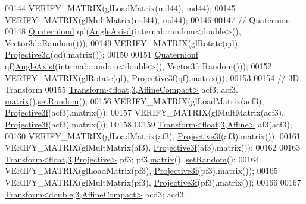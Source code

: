 \begin{DoxyCode}
00144   VERIFY\_MATRIX(glLoadMatrix(md44), md44);
00145   VERIFY\_MATRIX(glMultMatrix(md44), md44);
00146   
00147   \textcolor{comment}{// Quaternion}
00148   \hyperlink{group___geometry___module_class_eigen_1_1_quaternion}{Quaterniond} qd(\hyperlink{group___geometry___module_gac218cd8f23b49aa36401d0c843bb6835}{AngleAxisd}(internal::random<double>(), Vector3d::Random()));
00149   VERIFY\_MATRIX(glRotate(qd), \hyperlink{group___geometry___module_gab9cec8c457da930391eb73370e07aaae}{Projective3d}(qd).matrix());
00150   
00151   \hyperlink{group___geometry___module_class_eigen_1_1_quaternion}{Quaternionf} qf(\hyperlink{group___geometry___module_gadc7128416da41ca99bb8af814b78599e}{AngleAxisf}(internal::random<double>(), Vector3f::Random()));
00152   VERIFY\_MATRIX(glRotate(qf), \hyperlink{group___geometry___module_gab14804071b7486b6666f3d324475a478}{Projective3f}(qf).matrix());
00153   
00154   \textcolor{comment}{// 3D Transform}
00155   \hyperlink{group___geometry___module_class_eigen_1_1_transform}{Transform<float,3,AffineCompact>} acf3; acf3.
      \hyperlink{group___geometry___module_aec8168000a88a807130d41020af98d47}{matrix}().\hyperlink{class_eigen_1_1_plain_object_base_af0e576a0e1aefc9ee346de44cc352ba3}{setRandom}();
00156   VERIFY\_MATRIX(glLoadMatrix(acf3), \hyperlink{group___geometry___module_gab14804071b7486b6666f3d324475a478}{Projective3f}(acf3).matrix());
00157   VERIFY\_MATRIX(glMultMatrix(acf3), \hyperlink{group___geometry___module_gab14804071b7486b6666f3d324475a478}{Projective3f}(acf3).matrix());
00158   
00159   \hyperlink{group___geometry___module_class_eigen_1_1_transform}{Transform<float,3,Affine>} af3(acf3);
00160   VERIFY\_MATRIX(glLoadMatrix(af3), \hyperlink{group___geometry___module_gab14804071b7486b6666f3d324475a478}{Projective3f}(af3).matrix());
00161   VERIFY\_MATRIX(glMultMatrix(af3), \hyperlink{group___geometry___module_gab14804071b7486b6666f3d324475a478}{Projective3f}(af3).matrix());
00162   
00163   \hyperlink{group___geometry___module_class_eigen_1_1_transform}{Transform<float,3,Projective>} pf3; pf3.\hyperlink{group___geometry___module_aec8168000a88a807130d41020af98d47}{matrix}().
      \hyperlink{class_eigen_1_1_plain_object_base_af0e576a0e1aefc9ee346de44cc352ba3}{setRandom}();
00164   VERIFY\_MATRIX(glLoadMatrix(pf3), \hyperlink{group___geometry___module_gab14804071b7486b6666f3d324475a478}{Projective3f}(pf3).matrix());
00165   VERIFY\_MATRIX(glMultMatrix(pf3), \hyperlink{group___geometry___module_gab14804071b7486b6666f3d324475a478}{Projective3f}(pf3).matrix());
00166   
00167   \hyperlink{group___geometry___module_class_eigen_1_1_transform}{Transform<double,3,AffineCompact>} acd3; acd3.

\end{DoxyCode}
